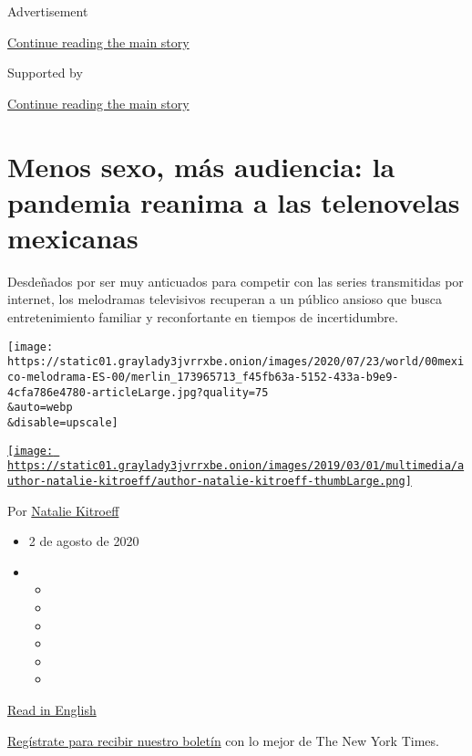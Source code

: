 Advertisement

\protect\hyperlink{after-top}{Continue reading the main story}

Supported by

\protect\hyperlink{after-sponsor}{Continue reading the main story}

\hypertarget{menos-sexo-muxe1s-audiencia-la-pandemia-reanima-a-las-telenovelas-mexicanas}{%
\section{Menos sexo, más audiencia: la pandemia reanima a las
telenovelas
mexicanas}\label{menos-sexo-muxe1s-audiencia-la-pandemia-reanima-a-las-telenovelas-mexicanas}}

Desdeñados por ser muy anticuados para competir con las series
transmitidas por internet, los melodramas televisivos recuperan a un
público ansioso que busca entretenimiento familiar y reconfortante en
tiempos de incertidumbre.

\texttt{[image: https://static01.graylady3jvrrxbe.onion/images/2020/07/23/world/00mexico-melodrama-ES-00/merlin\_173965713\_f45fb63a-5152-433a-b9e9-4cfa786e4780-articleLarge.jpg?quality=75\\\&auto=webp\\\&disable=upscale]}

\href{https://www.nytimes3xbfgragh.onion/by/natalie-kitroeff}{\texttt{[image: https://static01.graylady3jvrrxbe.onion/images/2019/03/01/multimedia/author-natalie-kitroeff/author-natalie-kitroeff-thumbLarge.png]}}

Por
\href{https://www.nytimes3xbfgragh.onion/by/natalie-kitroeff}{Natalie
Kitroeff}

\begin{itemize}
\item
  2 de agosto de 2020
\item
  \begin{itemize}
  \item
  \item
  \item
  \item
  \item
  \item
  \end{itemize}
\end{itemize}

\href{https://www.nytimes3xbfgragh.onion/2020/08/02/world/americas/mexico-tv-virus-telenovela.html}{Read
in English}

\href{https://www.nytimes3xbfgragh.onion/newsletters/el-times}{Regístrate
para recibir nuestro boletín} con lo mejor de The New York Times.


